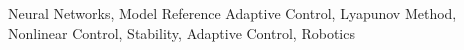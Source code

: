 \begin{abstract}
    \hl{...}
    \newline
\end{abstract}

\begin{IEEEkeywords}
    Neural Networks, Model Reference Adaptive Control, Lyapunov Method, Nonlinear Control, Stability, Adaptive Control, Robotics
\end{IEEEkeywords}